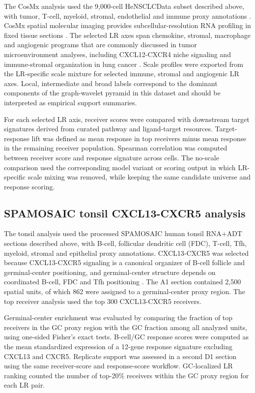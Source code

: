 \documentclass[referee,lineno,pdflatex,sn-vancouver-num]{sn-jnl}
\begin{document}
The CosMx analysis used the 9,000-cell HeNSCLCData subset described above, with tumor, T-cell, myeloid, stromal, endothelial and immune proxy annotations \citep{he2022cosmx,sfedata2026}. CosMx spatial molecular imaging provides subcellular-resolution RNA profiling in fixed tissue sections \citep{he2022cosmx}. The selected LR axes span chemokine, stromal, macrophage and angiogenic programs that are commonly discussed in tumor microenvironment analyses, including CXCL12-CXCR4 niche signaling and immune-stromal organization in lung cancer \citep{nagasawa2014cxcl12,lambrechts2018lung,bagaev2021tme}. Scale profiles were exported from the LR-specific scale mixture for selected immune, stromal and angiogenic LR axes. Local, intermediate and broad labels correspond to the dominant components of the graph-wavelet pyramid in this dataset and should be interpreted as empirical support summaries.

For each selected LR axis, receiver scores were compared with downstream target signatures derived from curated pathway and ligand-target resources. Target-response lift was defined as mean response in top receivers minus mean response in the remaining receiver population. Spearman correlation was computed between receiver score and response signature across cells. The no-scale comparison used the corresponding model variant or scoring output in which LR-specific scale mixing was removed, while keeping the same candidate universe and response scoring.

\subsection{SPAMOSAIC tonsil CXCL13-CXCR5 analysis}

The tonsil analysis used the processed SPAMOSAIC human tonsil RNA+ADT sections described above, with B-cell, follicular dendritic cell (FDC), T-cell, Tfh, myeloid, stromal and epithelial proxy annotations. CXCL13-CXCR5 was selected because CXCL13-CXCR5 signaling is a canonical organizer of B-cell follicle and germinal-center positioning, and germinal-center structure depends on coordinated B-cell, FDC and Tfh positioning \citep{forster1996cxcr5,luther2000cxcl13,ansel2000cxcl13,victora2012gc,cyster2019bcell,crotty2019tfh}. The A1 section contained 2,500 spatial units, of which 862 were assigned to a germinal-center proxy region. The top receiver analysis used the top 300 CXCL13-CXCR5 receivers.

Germinal-center enrichment was evaluated by comparing the fraction of top receivers in the GC proxy region with the GC fraction among all analyzed units, using one-sided Fisher's exact tests. B-cell/GC response scores were computed as the mean standardized expression of a 12-gene response signature excluding CXCL13 and CXCR5. Replicate support was assessed in a second D1 section using the same receiver-score and response-score workflow. GC-localized LR ranking counted the number of top-20\% receivers within the GC proxy region for each LR pair.
\end{document}
